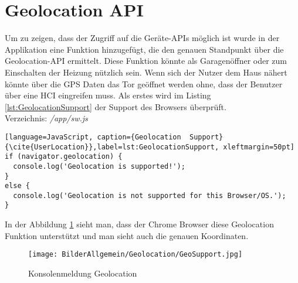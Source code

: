 \section{Geolocation API}
Um zu zeigen, dass der Zugriff auf die Geräte-APIs möglich ist wurde in der Applikation eine Funktion hinzugefügt, die den genauen Standpunkt über die Geolocation-API ermittelt. Diese Funktion könnte als Garagenöffner oder zum Einschalten der Heizung nützlich sein. Wenn sich der Nutzer dem Haus nähert könnte über die GPS Daten das Tor geöffnet werden ohne, dass der Benutzer über eine HCI eingreifen muss. 
Als erstes wird im Listing \ref{lst:GeolocationSupport} der Support des Browsers überprüft.\\
Verzeichnis: \textit{/app/sw.js}

\begin{lstlisting}[language=JavaScript, caption={Geolocation  Support} {\cite{UserLocation}},label=lst:GeolocationSupport, xleftmargin=50pt]
if (navigator.geolocation) {
  console.log('Geolocation is supported!');
}
else {
  console.log('Geolocation is not supported for this Browser/OS.');
}
\end{lstlisting}

In der Abbildung \ref{fig:GeoSupport} sieht man, dass der Chrome Browser diese Geolocation Funktion unterstützt und man sieht auch die genauen Koordinaten.

\begin{figure}[h]
	\centering
	\texttt{[image: BilderAllgemein/Geolocation/GeoSupport.jpg]}\medskip
	\caption{Konsolenmeldung Geolocation}
	\label{fig:GeoSupport}
\end{figure}







